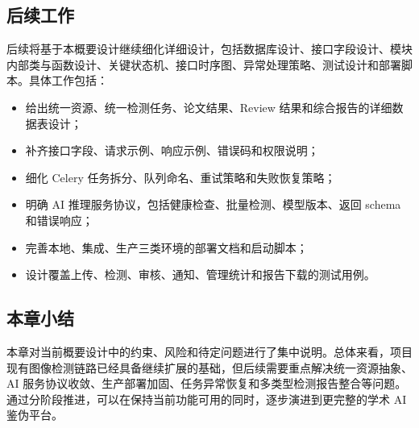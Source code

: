 \subsection{后续工作}
后续将基于本概要设计继续细化详细设计，包括数据库设计、接口字段设计、模块内部类与函数设计、关键状态机、接口时序图、异常处理策略、测试设计和部署脚本。具体工作包括：
\begin{itemize}[leftmargin=2em]
    \item 给出统一资源、统一检测任务、论文结果、Review 结果和综合报告的详细数据表设计；
    \item 补齐接口字段、请求示例、响应示例、错误码和权限说明；
    \item 细化 Celery 任务拆分、队列命名、重试策略和失败恢复策略；
    \item 明确 AI 推理服务协议，包括健康检查、批量检测、模型版本、返回 schema 和错误响应；
    \item 完善本地、集成、生产三类环境的部署文档和启动脚本；
    \item 设计覆盖上传、检测、审核、通知、管理统计和报告下载的测试用例。
\end{itemize}

\subsection{本章小结}
本章对当前概要设计中的约束、风险和待定问题进行了集中说明。总体来看，项目现有图像检测链路已经具备继续扩展的基础，但后续需要重点解决统一资源抽象、AI 服务协议收敛、生产部署加固、任务异常恢复和多类型检测报告整合等问题。通过分阶段推进，可以在保持当前功能可用的同时，逐步演进到更完整的学术 AI 鉴伪平台。
